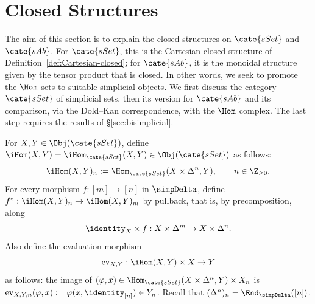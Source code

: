 
\section{Closed Structures}\label{sec:closed-simplicial}
\hypertarget{o014.aljabr2.chapter8.closed-structure}{ }
The aim of this section is to explain the closed structures on $\cate{sSet}$
and $\cate{sAb}$. For $\cate{sSet}$, this is the Cartesian closed structure
of Definition~\ref{def:Cartesian-closed}; for $\cate{sAb}$, it is the
monoidal structure given by the tensor product that is closed. In other
words, we seek to promote the $\Hom$ sets to suitable simplicial objects. We
first discuss the category $\cate{sSet}$ of simplicial sets, then its version
for $\cate{sAb}$ and its comparison, via the Dold--Kan correspondence, with
the $\Hom$ complex. The last step requires the results of
\S\ref{sec:bisimplicial}.

\begin{definition}\label{def:internal-Hom-sSet}
	For $X,Y\in\Obj(\cate{sSet})$, define
	$\iHom(X,Y)=\iHom_{\cate{sSet}}(X,Y)\in\Obj(\cate{sSet})$ as follows:
	\[
	\iHom(X,Y)_n:=\Hom_{\cate{sSet}}(X\times\Delta^n,Y),
	\qquad n\in\Z_{\geq0}.
	\]
	For every morphism $f:[m]\to[n]$ in $\simpDelta$, define
	$f^*:\iHom(X,Y)_n\to\iHom(X,Y)_m$ by pullback, that is, by
	precomposition, along
	\[
	\identity_X\times f:X\times\Delta^m\to X\times\Delta^n.
	\]
	Also define the evaluation morphism
	\[
	\mathrm{ev}_{X,Y}:\iHom(X,Y)\times X\to Y
	\]
	as follows: the image of
	$(\varphi,x)\in\Hom_{\cate{sSet}}(X\times\Delta^n,Y)\times X_n$ is
	$\mathrm{ev}_{X,Y,n}(\varphi,x):=\varphi(x,\identity_{[n]})\in Y_n$.
	Recall that $(\Delta^n)_n=\End_{\simpDelta}([n])$.
\end{definition}

